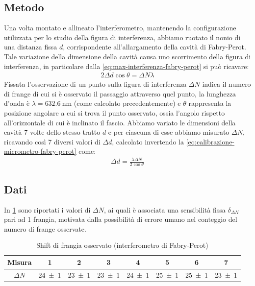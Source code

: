 \documentclass[a4paper]{article}
\begin{document}
\subsection{Metodo}
Una volta montato e allineato l'interferometro, mantenendo la configurazione utilizzata per lo studio della figura di interferenza, abbiamo ruotato il 
nonio di una distanza fissa $d$, corrispondente all'allargamento della cavità di Fabry-Perot. Tale variazione della dimensione della cavità causa uno
scorrimento della figura di interferenza, in particolare dalla \cref{eq:max-interferenza-fabry-perot} si può ricavare:
\begin{align}
    2 \Delta d \cos  \theta = \Delta N \lambda
\label{eq:calibrazione-micrometro-fabry-perot}
\end{align}
Fissata l'osservazione di un punto sulla figura di interferenza $\Delta N$ indica il numero di frange di cui si è osservato il passaggio attraverso quel punto, la lunghezza d'onda è $\lambda = \SI{632.6}{\nano\meter}$ (come calcolato precedentemente) e $\theta$ rappresenta la posizione angolare a cui si trova il punto osservato, ossia l'angolo rispetto all'orizzontale di cui è inclinato il fascio.
Abbiamo variato le dimensioni della cavità 7 volte dello stesso tratto $d$ e per ciascuna di esse abbiamo misurato $\Delta N$, ricavando così 7 diversi valori di $\Delta d$, calcolato invertendo la \cref{eq:calibrazione-micrometro-fabry-perot} come:
\begin{align}
    \Delta d = \frac{\lambda \Delta N}{2\cos{\theta}}
\label{eq:calibrazione-micrometro-fabry-perot-invertita}
\end{align}

\subsection{Dati}
In \cref{tab:micrometro-fabry-perot} sono riportati i valori di $\Delta N$, ai quali è associata una sensibilità fissa $\delta_{\Delta N}$ pari ad 1 frangia, motivata dalla possibilità di errore umano nel conteggio del numero di frange osservate.

\begin{table}[htbp]
\centering
\caption{Shift di frangia osservato (interferometro di Fabry-Perot)}
\begin{tabular}{cccccccc}
\toprule
Misura & 1 & 2 & 3 & 4 & 5 & 6 & 7 \\
\midrule
$\Delta N$ & \num{24 \pm 1} & \num{23 \pm 1} & \num{23 \pm 1} & \num{24 \pm 1} & \num{25 \pm 1} & \num{25 \pm 1} & \num{23 \pm 1} \\
\bottomrule
\end{tabular}
\label{tab:micrometro-fabry-perot}
\end{table}
\end{document}
